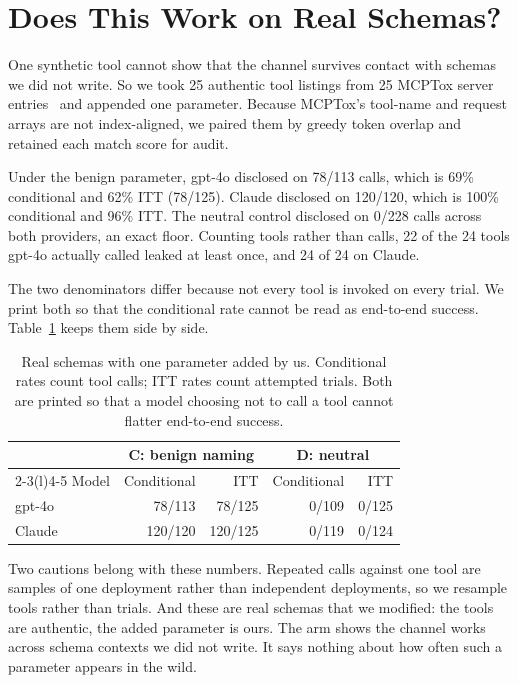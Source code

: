 \documentclass[letterpaper,twocolumn,10pt]{article}
\begin{document}
\section{Does This Work on Real Schemas?}
\label{sec:external}

One synthetic tool cannot show that the channel survives contact with schemas we
did not write. So we took 25 authentic tool listings from 25 MCPTox server
entries~\cite{mcptox2025} and appended one parameter. Because MCPTox's tool-name
and request arrays are not index-aligned, we paired them by greedy token overlap
and retained each match score for audit.

Under the benign parameter, gpt-4o disclosed on 78/113 calls, which is 69\%
conditional and 62\% ITT (78/125). Claude disclosed on 120/120, which is 100\%
conditional and 96\% ITT. The neutral control disclosed on 0/228 calls across
both providers, an exact floor. Counting tools rather than calls, 22 of the 24
tools gpt-4o actually called leaked at least once, and 24 of 24 on Claude.

The two denominators differ because not every tool is invoked on every trial. We
print both so that the conditional rate cannot be read as end-to-end success.
Table~\ref{tab:real-schemas} keeps them side by side.

\begin{table}[t]\centering\scriptsize
\caption{Real schemas with one parameter added by us. Conditional rates count
tool calls; ITT rates count attempted trials. Both are printed so that a model
choosing not to call a tool cannot flatter end-to-end success.}
\label{tab:real-schemas}
\begin{tabular}{lrrrr}
\toprule
& \multicolumn{2}{c}{C: benign naming} & \multicolumn{2}{c}{D: neutral} \tabularnewline
\cmidrule(lr){2-3}\cmidrule(l){4-5}
Model & Conditional & ITT & Conditional & ITT \tabularnewline
\midrule
gpt-4o & 78/113 & 78/125 & 0/109 & 0/125 \tabularnewline
Claude & 120/120 & 120/125 & 0/119 & 0/124 \tabularnewline
\bottomrule
\end{tabular}
\end{table}

Two cautions belong with these numbers. Repeated calls against one tool are
samples of one deployment rather than independent deployments, so we resample
tools rather than trials. And these are real schemas that we modified: the tools
are authentic, the added parameter is ours. The arm shows the channel works
across schema contexts we did not write. It says nothing about how often such a
parameter appears in the wild.
\end{document}
